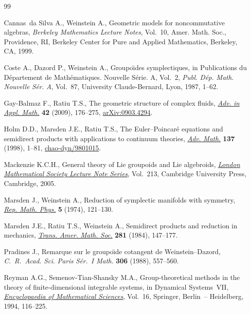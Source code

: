 \documentclass[10pt,a4paper]{amsart}
\numberwithin{equation}{section}
\begin{document}
\begin{thebibliography}{99}
\footnotesize\itemsep=0pt

Cannas~da Silva A., Weinstein A., Geometric models for noncommutative algebras,
 \textit{Berkeley Mathematics Lecture Notes}, Vol.~10, Amer. Math. Soc.,
 Providence, RI, Berkeley Center for Pure and Applied Mathematics, Berkeley,
 CA, 1999.

Coste A., Dazord P., Weinstein A., Groupo\"\i des symplectiques, in
 Publications du {D}\'epartement de {M}ath\'ematiques. {N}ouvelle {S}\'erie.
 {A}, {V}ol.~2, \textit{Publ. D\'ep. Math. Nouvelle S\'er. A}, Vol.~87,
 University Claude-Bernard, Lyon, 1987, 1--62.

Gay-Balmaz F., Ratiu T.S., The geometric structure of complex f\/luids,
 \href{https://doi.org/10.1016/j.aam.2008.06.002}{\textit{Adv. in Appl. Math.}} \textbf{42} (2009), 176--275,
 \href{https://arxiv.org/abs/0903.4294}{arXiv:0903.4294}.

Holm D.D., Marsden J.E., Ratiu T.S., The {E}uler--{P}oincar\'e equations and
 semidirect products with applications to continuum theories, \href{https://doi.org/10.1006/aima.1998.1721}{\textit{Adv.
 Math.}} \textbf{137} (1998), 1--81, \href{https://arxiv.org/abs/chao-dyn/9801015}{chao-dyn/9801015}.

Mackenzie K.C.H., General theory of {L}ie groupoids and {L}ie algebroids,
 \href{https://doi.org/10.1017/CBO9781107325883}{\textit{London Mathematical Society Lecture Note Series}}, Vol.~213, Cambridge
 University Press, Cambridge, 2005.

Marsden J., Weinstein A., Reduction of symplectic manifolds with symmetry,
 \href{https://doi.org/10.1016/0034-4877(74)90021-4}{\textit{Rep. Math. Phys.}} \textbf{5} (1974), 121--130.

Marsden J.E., Ratiu T.S., Weinstein A., Semidirect products and reduction in
 mechanics, \href{https://doi.org/10.2307/1999527}{\textit{Trans. Amer. Math. Soc.}} \textbf{281} (1984), 147--177.

Pradines J., Remarque sur le groupo\"{\i}de cotangent de {W}einstein--{D}azord,
 \textit{C.~R.~Acad. Sci. Paris S\'er.~I Math.} \textbf{306} (1988), 557--560.

Reyman A.G., Semenov-Tian-Shansky M.A., Group-theoretical methods in the theory
 of f\/inite-dimensional integrable systems, in Dynamical Systems~VII,
 \href{https://doi.org/10.1007/978-3-662-06796-3_7}{\textit{Encyclopaedia of Mathematical Sciences}}, Vol.~16, Springer, Berlin~--
 Heidelberg, 1994, 116--225.


\end{thebibliography}
\end{document}
